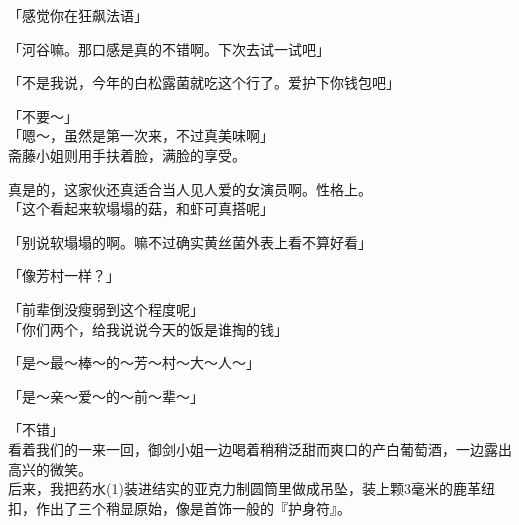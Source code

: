 「感觉你在狂飙法语」

「河谷嘛。那口感是真的不错啊。下次去试一试吧」

「不是我说，今年的白松露菌就吃这个行了。爱护下你钱包吧」

「不要～」\\

「嗯～，虽然是第一次来，不过真美味啊」\\

斋藤小姐则用手扶着脸，满脸的享受。

真是的，这家伙还真适合当人见人爱的女演员啊。性格上。\\

「这个看起来软塌塌的菇，和虾可真搭呢」

「别说软塌塌的啊。嘛不过确实黄丝菌外表上看不算好看」

「像芳村一样？」

「前辈倒没瘦弱到这个程度呢」\\

「你们两个，给我说说今天的饭是谁掏的钱」

「是～最～棒～的～芳～村～大～人～」

「是～亲～爱～的～前～辈～」

「不错」\\

看着我们的一来一回，御剑小姐一边喝着稍稍泛甜而爽口的产白葡萄酒，一边露出高兴的微笑。\\

后来，我把药水(1)装进结实的亚克力制圆筒里做成吊坠，装上颗3毫米的鹿革纽扣，作出了三个稍显原始，像是首饰一般的『护身符』。

